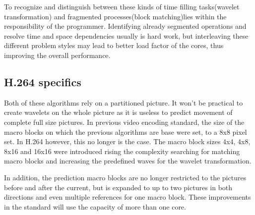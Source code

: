 To recognize and distinguish between these kinds of time filling tasks(wavelet transformation) and fragmented processes(block  matching)lies within the responsibility of the programmer.
Identifying already segmented operations and resolve time and space dependencies usually is hard work, but interleaving these different problem styles may lead to better load factor of the cores, thus improving the overall performance.

\subsection{H.264 specifics}
\label{subsec:h264}
Both of these algorithms rely on a partitioned picture. It won't be practical to create wavelets on the whole picture as it is useless to predict movement of complete full size pictures. In previous video encoding standard, the size of the macro blocks on which the previous algorithms are base were set, to a 8x8 pixel set. In H.264 however, this no longer is the case. The macro block sizes 4x4, 4x8, 8x16 and 16x16 were introduced rising the complexity searching for matching macro blocks and increasing the predefined waves for the wavelet transformation.

In addition, the prediction macro blocks are no longer restricted to the pictures before and after the current, but is expanded to up to two pictures in both directions and even multiple references for one macro block.\cite{WS03} These improvements in the standard will use the capacity of more than one core.